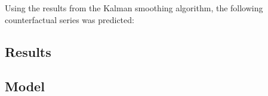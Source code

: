 \documentclass[12pt]{article}
\begin{document}
Using the results from the Kalman smoothing algorithm, the following counterfactual series was predicted:





\subsection{Results}

\subsection{Model}



 

\end{document}

